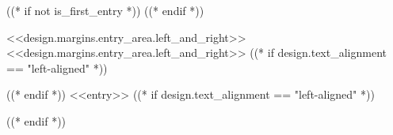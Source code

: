 ((* if not is_first_entry *))
\vspace{<<design.margins.entry_area.vertical_between>>}
((* endif *))
\begin{changemargin}{<<design.margins.entry_area.left_and_right>>}{<<design.margins.entry_area.left_and_right>>}
((* if design.text_alignment == "left-aligned" *))
\raggedright
((* endif *))
<<entry>>
((* if design.text_alignment == "left-aligned" *))
\par
((* endif *))
\end{changemargin}



